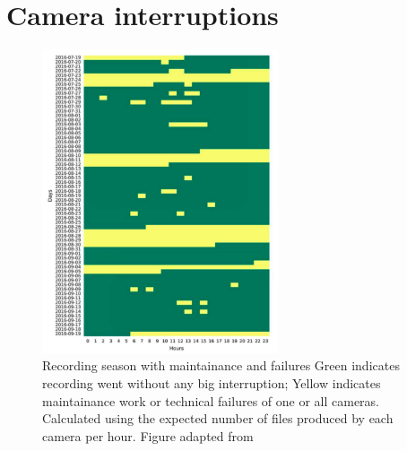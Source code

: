 \chapter{Camera interruptions} 

\begin{figure}[htbp!] 
\centering
\includegraphics[width=0.62\textwidth]{End-sections/Appendix2/beedays-schlegel.png}
\caption[beedays-schlegel]{Recording season with maintainance and failures Green indicates recording went without any big interruption; Yellow indicates maintainance work or technical failures of one or all cameras. Calculated using the expected number of files produced by each camera per hour. Figure adapted from \cite{schlegel_temporal_2017}}
\label{fig:beedays-schlegel}
\end{figure}